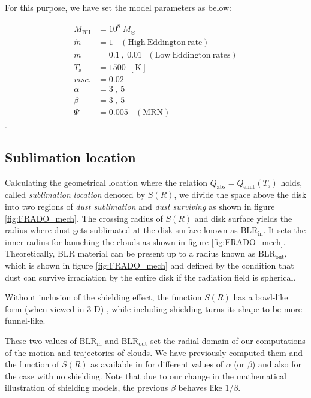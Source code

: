 \documentclass[twocolumn]{aastex62}
\begin{document}
For this purpose, we have set the model parameters as below:

\begin{equation}
\begin{array}{ll}
M_{\mathrm{BH}} & = 10^8~ M_{\odot} \\
\dot m & = 1 ~~~~ \mathrm{(High~Eddington~rate)}  \\
\dot m & = 0.1~,~ 0.01 ~~~ \mathrm{(Low~Eddington~rates)}  \\
T_{\mathrm{s}} & = 1500 ~~ \mathrm{[K]} \\
visc. & = 0.02 \\
\alpha & = 3~,~ 5 \\
\beta & = 3~,~ 5 \\
\Psi & = 0.005 ~~~~ \mathrm{(MRN)}
\end{array}
\end{equation}.

\subsection{Sublimation location}

Calculating the geometrical location where the relation $Q_{\mathrm{abs}} = Q_{\mathrm{emit}}(T_{\mathrm{s}})$ holds, called \emph{sublimation location} denoted by $S(R)$, we divide the space above the disk into two regions of \emph{dust sublimation} and \emph{dust surviving} as shown in figure \ref{fig:FRADO_mech}. The crossing radius of $S(R)$ and disk surface yields the radius where dust gets sublimated at the disk surface known as $\mathrm{BLR}_{\mathrm{in}}$. It sets the inner radius for launching the clouds as shown in figure \ref{fig:FRADO_mech}. Theoretically, BLR material can be present up to a radius known as $\mathrm{BLR}_{\mathrm{out}}$, which is shown in figure \ref{fig:FRADO_mech} and defined by the condition that dust can survive irradiation by the entire disk if the radiation field is spherical.

Without inclusion of the shielding effect, the function $S(R)$ has a bowl-like form (when viewed in 3-D) \citep[e.g.][]{ Kawaguchi2010, Kawaguchi2011, Czerny2011, Goad2012, Oknyansky2015, Figaredo2020}, while including shielding turns its shape to be more funnel-like.

These two values of $\mathrm{BLR}_{\mathrm{in}}$ and $\mathrm{BLR}_{\mathrm{out}}$ set the radial domain of our computations of the motion and trajectories of clouds. We have previously computed them and the function of $S(R)$ as available in \citet{Naddaf2020} for different values of $\alpha$ (or $\beta$) and also for the case with no shielding. Note that due to our change in the mathematical illustration of shielding models, the previous $\beta$ behaves like $1 / \beta$.
\end{document}
